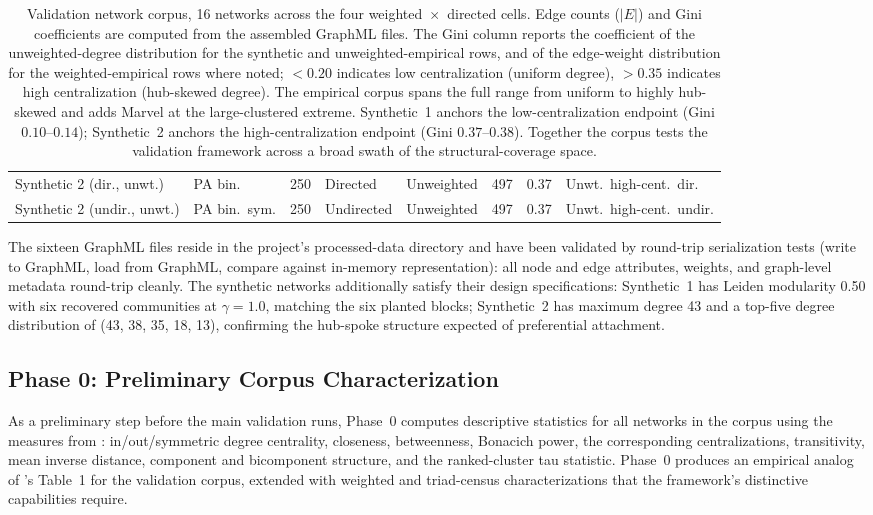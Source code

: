 \documentclass[11pt]{article}
\begin{document}
\begin{table}[h]
\begin{tabular}{l l r l l r c l}
Synthetic 2 (dir., unwt.)  & PA bin.         & 250      & Directed   & Unweighted & 497     & 0.37 & Unwt.\ high-cent.\ dir. \\
Synthetic 2 (undir., unwt.) & PA bin.\ sym.  & 250      & Undirected & Unweighted & 497     & 0.37 & Unwt.\ high-cent.\ undir. \\
\bottomrule
\end{tabular}
\caption{Validation network corpus, 16 networks across the four weighted~$\times$~directed cells. Edge counts ($\lvert E \rvert$) and Gini coefficients are computed from the assembled GraphML files. The Gini column reports the coefficient of the unweighted-degree distribution for the synthetic and unweighted-empirical rows, and of the edge-weight distribution for the weighted-empirical rows where noted; $<0.20$ indicates low centralization (uniform degree), $>0.35$ indicates high centralization (hub-skewed degree). The empirical corpus spans the full range from uniform to highly hub-skewed and adds Marvel at the large-clustered extreme. Synthetic~1 anchors the low-centralization endpoint (Gini $0.10$--$0.14$); Synthetic~2 anchors the high-centralization endpoint (Gini $0.37$--$0.38$). Together the corpus tests the validation framework across a broad swath of the structural-coverage space.}
\label{tab:corpus}
\end{table}

The sixteen GraphML files reside in the project's processed-data directory and have been validated by round-trip serialization tests (write to GraphML, load from GraphML, compare against in-memory representation): all node and edge attributes, weights, and graph-level metadata round-trip cleanly. The synthetic networks additionally satisfy their design specifications: Synthetic~1 has Leiden modularity 0.50 with six recovered communities at $\gamma = 1.0$, matching the six planted blocks; Synthetic~2 has maximum degree 43 and a top-five degree distribution of (43, 38, 35, 18, 13), confirming the hub-spoke structure expected of preferential attachment.

\subsection{Phase 0: Preliminary Corpus Characterization}
\label{sec:phase0}

As a preliminary step before the main validation runs, Phase~0 computes descriptive statistics for all networks in the corpus using the measures from \citet{SmithMorganMoody2022}: in/out/symmetric degree centrality, closeness, betweenness, Bonacich power, the corresponding centralizations, transitivity, mean inverse distance, component and bicomponent structure, and the ranked-cluster tau statistic. Phase~0 produces an empirical analog of \citet{SmithMorganMoody2022}'s Table~1 for the validation corpus, extended with weighted and triad-census characterizations that the framework's distinctive capabilities require.
\end{document}
